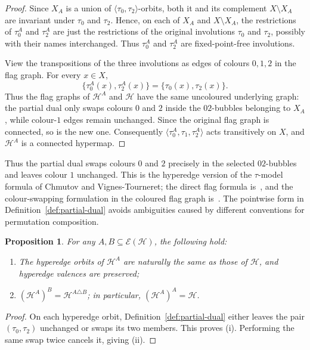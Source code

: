\documentclass{article}
\newtheorem{proposition}[theorem]{Proposition}
\theoremstyle{definition}
\theoremstyle{remark}
\newcommand{\Hcal}{\mathcal{H}}
\newcommand{\Ecal}{\mathcal{E}}
\begin{document}
\begin{proof}
Since $X_A$ is a union of $\langle\tau_0,\tau_2\rangle$-orbits, both it and its complement $X\setminus X_A$ are invariant under $\tau_0$ and $\tau_2$. Hence, on each of $X_A$ and $X\setminus X_A$, the restrictions of $\tau_0^A$ and $\tau_2^A$ are just the restrictions of the original involutions $\tau_0$ and $\tau_2$, possibly with their names interchanged. Thus $\tau_0^A$ and $\tau_2^A$ are fixed-point-free involutions.

View the transpositions of the three involutions as edges of colours $0,1,2$ in the flag graph. For every $x\in X$,
\[
 \bigl\{\tau_0^A(x),\tau_2^A(x)\bigr\}
 =
 \bigl\{\tau_0(x),\tau_2(x)\bigr\}.
\]
Thus the flag graphs of $\Hcal^A$ and $\Hcal$ have the same uncoloured underlying graph: the partial dual only swaps colours $0$ and $2$ inside the $02$-bubbles belonging to $X_A$, while colour-$1$ edges remain unchanged. Since the original flag graph is connected, so is the new one. Consequently $\langle\tau_0^A,\tau_1,\tau_2^A\rangle$ acts transitively on $X$, and $\Hcal^A$ is a connected hypermap.
\end{proof}

Thus the partial dual swaps colours $0$ and $2$ precisely in the selected $02$-bubbles and leaves colour $1$ unchanged. This is the hyperedge version of the $\tau$-model formula of Chmutov and Vignes-Tourneret; the direct flag formula is~\cite[Theorem~2.6]{ChmutovVignes2022}, and the colour-swapping formulation in the coloured flag graph is~\cite[Theorem~2.8]{ChmutovVignes2022}. The pointwise form in Definition~\ref{def:partial-dual} avoids ambiguities caused by different conventions for permutation composition.

\begin{proposition}\label{prop:basic-pd}
For any $A,B\subseteq\Ecal(\Hcal)$, the following hold:
\begin{enumerate}[label=\textup{(\roman*)}]
\item The hyperedge orbits of $\Hcal^A$ are naturally the same as those of $\Hcal$, and hyperedge valences are preserved;
\item $(\Hcal^A)^B=\Hcal^{A\triangle B}$; in particular, $(\Hcal^A)^A=\Hcal$.
\end{enumerate}
\end{proposition}

\begin{proof}
On each hyperedge orbit, Definition~\ref{def:partial-dual} either leaves the pair $(\tau_0,\tau_2)$ unchanged or swaps its two members. This proves (i). Performing the same swap twice cancels it, giving (ii).
\end{proof}
\end{document}
